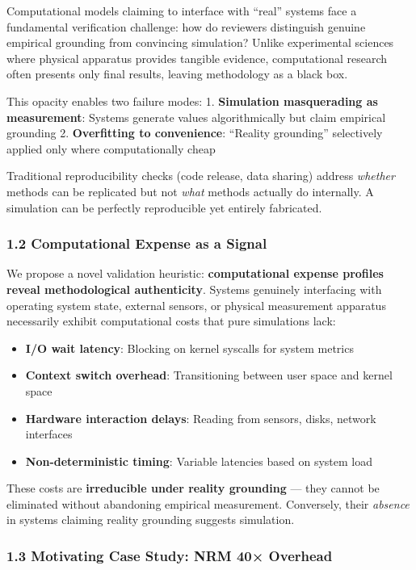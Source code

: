 \documentclass[
]{article}
\providecommand{\tightlist}{%
  \setlength{\itemsep}{0pt}\setlength{\parskip}{0pt}}
\begin{document}
Computational models claiming to interface with ``real'' systems face a
fundamental verification challenge: how do reviewers distinguish genuine
empirical grounding from convincing simulation? Unlike experimental
sciences where physical apparatus provides tangible evidence,
computational research often presents only final results, leaving
methodology as a black box.

This opacity enables two failure modes: 1. \textbf{Simulation
masquerading as measurement}: Systems generate values algorithmically
but claim empirical grounding 2. \textbf{Overfitting to convenience}:
``Reality grounding'' selectively applied only where computationally
cheap

Traditional reproducibility checks (code release, data sharing) address
\emph{whether} methods can be replicated but not \emph{what} methods
actually do internally. A simulation can be perfectly reproducible yet
entirely fabricated.

\subsubsection{1.2 Computational Expense as a
Signal}\label{computational-expense-as-a-signal}

We propose a novel validation heuristic: \textbf{computational expense
profiles reveal methodological authenticity}. Systems genuinely
interfacing with operating system state, external sensors, or physical
measurement apparatus necessarily exhibit computational costs that pure
simulations lack:

\begin{itemize}
\tightlist
\item
  \textbf{I/O wait latency}: Blocking on kernel syscalls for system
  metrics
\item
  \textbf{Context switch overhead}: Transitioning between user space and
  kernel space
\item
  \textbf{Hardware interaction delays}: Reading from sensors, disks,
  network interfaces
\item
  \textbf{Non-deterministic timing}: Variable latencies based on system
  load
\end{itemize}

These costs are \textbf{irreducible under reality grounding} --- they
cannot be eliminated without abandoning empirical measurement.
Conversely, their \emph{absence} in systems claiming reality grounding
suggests simulation.

\subsubsection{1.3 Motivating Case Study: NRM 40×
Overhead}\label{motivating-case-study-nrm-40-overhead}
\end{document}
